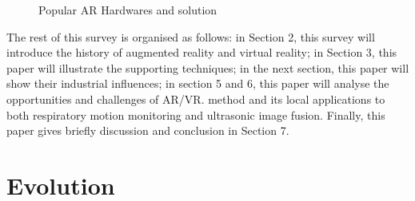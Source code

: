 \documentclass[preprint,12pt]{elsarticle}
\begin{document}
\begin{figure}[!hbp]
	\centering
	\caption{Popular AR Hardwares and solution}
	\label{AR products}
\end{figure}


The rest of this survey is organised as follows: in Section 2, this survey will introduce the history of augmented reality and virtual reality; in Section 3, this paper will illustrate the supporting techniques; in the next section, this paper will show their industrial influences; in section 5 and 6, this paper will analyse the opportunities and challenges of AR/VR.  method and its local applications to both respiratory motion monitoring and ultrasonic image fusion. Finally, this paper gives briefly discussion and conclusion in Section 7.%

\section{Evolution}  %
\end{document}
